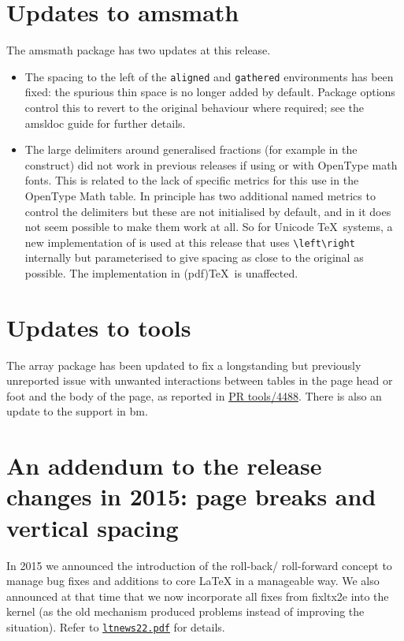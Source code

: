 \documentclass{ltnews}
\begin{document}
\section{Updates to \textsf{amsmath}}
The \textsf{amsmath} package has two updates at this release.
\begin{itemize}
\item The spacing to the left of the \texttt{aligned} and
  \texttt{gathered} environments has been fixed: the spurious thin
  space is no longer added by default. Package options control this
  to revert to the original behaviour where required; see the
  \textsf{amsldoc} guide for further details. 
\item The large delimiters around generalised fractions (for example
  in the  construct) did not work in previous releases if
  using  or  with OpenType math fonts. This is
  related to the lack of specific metrics for this use in the OpenType Math
  table. In principle  has two additional named metrics
  to control the delimiters but these are not initialised by default,
  and in  it does not seem possible to make them work at all.
  So for Unicode \TeX\ systems, a new implementation of
   is used at this release that uses \verb|\left\right|
  internally but parameterised to give spacing as close to the
  original as possible. The implementation in (pdf)\TeX\ is
  unaffected.
\end{itemize}

\section{Updates to \textsf{tools}}
The \textsf{array} package has been updated to fix a longstanding but
previously unreported issue with unwanted interactions between tables
in the page head or foot and the body of the page, as reported in
\href{http://www.latex-project.org/cgi-bin/ltxbugs2html?pr=tools/4488}{PR
  tools/4488}.
There is also an update to the  support in \textsf{bm}.

\section{An addendum to the release changes in 2015:  page breaks and vertical spacing}

In 2015 we announced the introduction of the roll-back\slash
roll-forward concept to manage bug fixes and additions to core
\LaTeX{} in a manageable way. We also announced at that time
that we now incorporate all fixes from \textsf{fixltx2e} into the
kernel (as the old mechanism produced problems instead of improving
the situation). Refer to
\href{https://www.latex-project.org/news/latex2e-news/ltnews22.pdf}{\texttt{ltnews22.pdf}}
for details.
\end{document}
